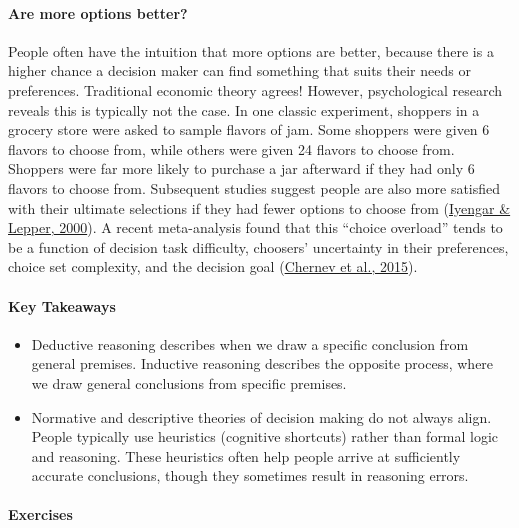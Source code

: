\documentclass[
]{krantz}
\providecommand{\tightlist}{%
  \setlength{\itemsep}{0pt}\setlength{\parskip}{0pt}}
\begin{document}
\hypertarget{are-more-options-better}{%
\paragraph*{Are more options better?}\label{are-more-options-better}}

People often have the intuition that more options are better, because there is a higher chance a decision maker can find something that suits their needs or preferences. Traditional economic theory agrees! However, psychological research reveals this is typically not the case. In one classic experiment, shoppers in a grocery store were asked to sample flavors of jam. Some shoppers were given 6 flavors to choose from, while others were given 24 flavors to choose from. Shoppers were far more likely to purchase a jar afterward if they had only 6 flavors to choose from. Subsequent studies suggest people are also more satisfied with their ultimate selections if they had fewer options to choose from (\protect\hyperlink{ref-iyengar2000choice}{Iyengar \& Lepper, 2000}). A recent meta-analysis found that this ``choice overload'' tends to be a function of decision task difficulty, choosers' uncertainty in their preferences, choice set complexity, and the decision goal (\protect\hyperlink{ref-chernev2015choice}{Chernev et al., 2015}).

\hypertarget{key-takeaways-8}{%
\paragraph*{Key Takeaways}\label{key-takeaways-8}}

\begin{itemize}
\tightlist
\item
  Deductive reasoning describes when we draw a specific conclusion from general premises. Inductive reasoning describes the opposite process, where we draw general conclusions from specific premises.
\item
  Normative and descriptive theories of decision making do not always align. People typically use heuristics (cognitive shortcuts) rather than formal logic and reasoning. These heuristics often help people arrive at sufficiently accurate conclusions, though they sometimes result in reasoning errors.
\end{itemize}

\hypertarget{exercises-8}{%
\paragraph*{Exercises}\label{exercises-8}}
\end{document}
